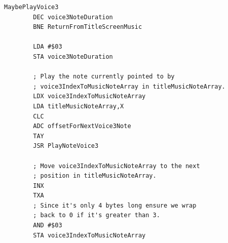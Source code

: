 \begin{lstlisting}[caption= \icode{MaybePlayVoice3}\, part of \icode{PlayTitleScreenMusic}.]
MaybePlayVoice3   
        DEC voice3NoteDuration
        BNE ReturnFromTitleScreenMusic

        LDA #$03
        STA voice3NoteDuration

        ; Play the note currently pointed to by 
        ; voice3IndexToMusicNoteArray in titleMusicNoteArray.
        LDX voice3IndexToMusicNoteArray
        LDA titleMusicNoteArray,X
        CLC
        ADC offsetForNextVoice3Note
        TAY
        JSR PlayNoteVoice3

        ; Move voice3IndexToMusicNoteArray to the next
        ; position in titleMusicNoteArray.
        INX
        TXA
        ; Since it's only 4 bytes long ensure we wrap
        ; back to 0 if it's greater than 3.
        AND #$03
        STA voice3IndexToMusicNoteArray
\end{lstlisting}

